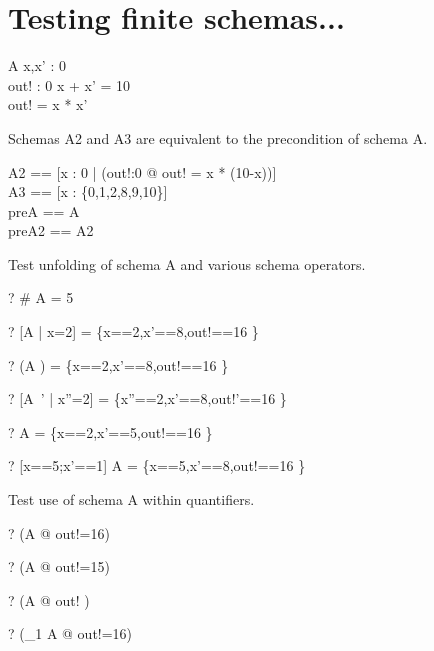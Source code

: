 \documentclass{article}
\begin{document}
\section{Testing finite schemas...}

\begin{schema}{A}
  x,x' : 0  \\
  out! : 0 
\where
  x + x' = 10 \\
  out! = x * x'
\end{schema}

Schemas A2 and A3 are equivalent to the precondition of schema A.
\begin{zed}
  A2 == [x : 0  | (\exists out!:0  @ out! = x * (10-x))]
\\
  A3 == [x : \{0,1,2,8,9,10\}]
\\
  preA == \pre A
\\
  preA2 == \pre A2
\end{zed}

Test unfolding of schema A and various schema operators.
\begin{zed} \vdash? 
  \# A = 5
\end{zed}
\begin{zed} \vdash? 
  [A | x=2] = \{\lblot x==2,x'==8,out!==16 \rblot\}
\end{zed}
\begin{zed} \vdash? 
  (A \land [x:\{2\}]) = \{\lblot x==2,x'==8,out!==16 \rblot\}
\end{zed}
\begin{zed} \vdash? 
  [A~' | x''=2] = \{\lblot x''==2,x'==8,out!'==16 \rblot\}
\end{zed}
\begin{zed} \vdash? 
  A \semi [x : \{8\}; x'==5] = \{\lblot x==2,x'==5,out!==16 \rblot\}
\end{zed}
\begin{zed} \vdash? 
  [x==5;x'==1] \semi A  =  \{\lblot x==5,x'==8,out!==16 \rblot\}
\end{zed}

Test use of schema A within quantifiers.
\begin{zed} \vdash? (\exists A @ out!=16) \end{zed}
\begin{zed} \vdash? \lnot (\exists A @ out!=15) \end{zed}
\begin{zed} \vdash? (\forall A @ out! ) \end{zed}
\begin{zed} \vdash? (\exists_1 A @ out!=16) \end{zed}
\end{document}
